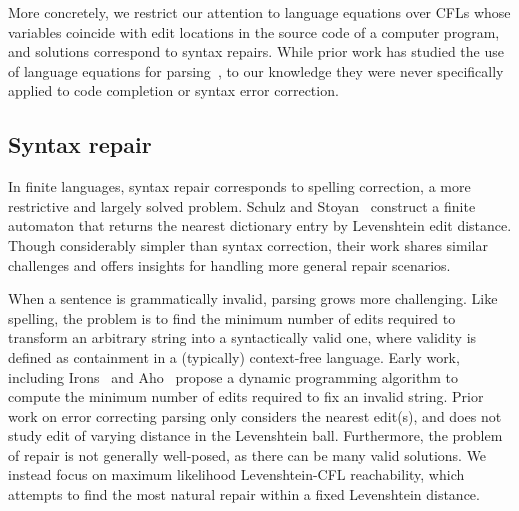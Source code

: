 \documentclass[sigplan,acmsmall,nonacm,screen]{acmart}\settopmatter{printfolios=false,printccs=false,printacmref=false}
\begin{document}
  More concretely, we restrict our attention to language equations over CFLs whose variables coincide with edit locations in the source code of a computer program, and solutions correspond to syntax repairs. While prior work has studied the use of language equations for parsing~\cite{might2011parsing}, to our knowledge they were never specifically applied to code completion or syntax error correction.

  \subsection{Syntax repair}

  In finite languages, syntax repair corresponds to spelling correction, a more restrictive and largely solved problem. Schulz and Stoyan~\cite{schulz2002fast} construct a finite automaton that returns the nearest dictionary entry by Levenshtein edit distance. Though considerably simpler than syntax correction, their work shares similar challenges and offers insights for handling more general repair scenarios.

  When a sentence is grammatically invalid, parsing grows more challenging. Like spelling, the problem is to find the minimum number of edits required to transform an arbitrary string into a syntactically valid one, where validity is defined as containment in a (typically) context-free language. Early work, including Irons~\cite{irons1963error} and Aho~\cite{aho1972minimum} propose a dynamic programming algorithm to compute the minimum number of edits required to fix an invalid string. Prior work on error correcting parsing only considers the nearest edit(s), and does not study edit of varying distance in the Levenshtein ball. Furthermore, the problem of repair is not generally well-posed, as there can be many valid solutions. We instead focus on maximum likelihood Levenshtein-CFL reachability, which attempts to find the most natural repair within a fixed Levenshtein distance.


\end{document}
